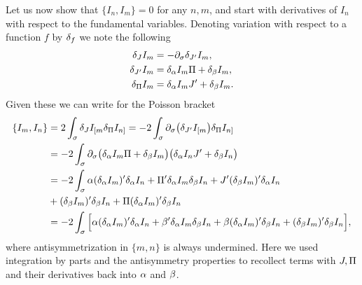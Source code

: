 \documentclass[12pt]{article}%
\numberwithin{equation}{section}
\begin{document}
Let us now show that $\{I_n,I_m\}=0$ for any $n,m$, and start with derivatives of $I_n$ with respect to the fundamental variables. Denoting variation with respect to a function $f$ by $\d_f$ we note the  following
\begin{equation}
\begin{split}
\d_J I_m&=-\dt_\s \d_{J'}I_m,\\
\d_{J'}I_m&=\d_\a I_m \P+\d_\b I_m,\\
\d_{\P}I_m&=\d_\a I_m J'+\d_\b I_m.
\end{split}
\end{equation}
Given these we can write for the Poisson bracket
\begin{equation}
\begin{aligned}
\{I_m,I_n\}&=2\int_\s\d_J I_{[m} \d_\P I_{n]}=-2\int_\s\dt_\s\big(\d_{J'} I_{[m}\big)\d_\P I_{n]}\\
&=-2\int_\s \dt_\s \big(\d_\a I_m \P+\d_\b I_m\big)\big(\d_\a I_n J'+\d_\b I_n\big)\\
&=-2\int_\s \a(\d_\a I_m)'\d_\a I_n+\P'\d_\a I_m \d_\b I_n +J'(\d_\b I_m)'\d_\a I_n\\
&+(\d_\b I_m)'\d_\b I_n+\P(\d_\a I_m)'\d_\b I_n\\
&=-2\int_\s\Big[\a (\d_\a I_m)'\d_\a I_n+\b'\d_\a I_m \d_\b I_n +\b (\d_\a I_m)'\d_\b I_n+(\d_\b I_m)'\d_\b I_n\Big],
\end{aligned}
\end{equation}
where antisymmetrization in $\{m,n\}$ is always undermined. Here we used integration by parts and the antisymmetry properties to recollect terms with $J,\P$ and their derivatives back into $\a$ and $\b$.
\end{document}
